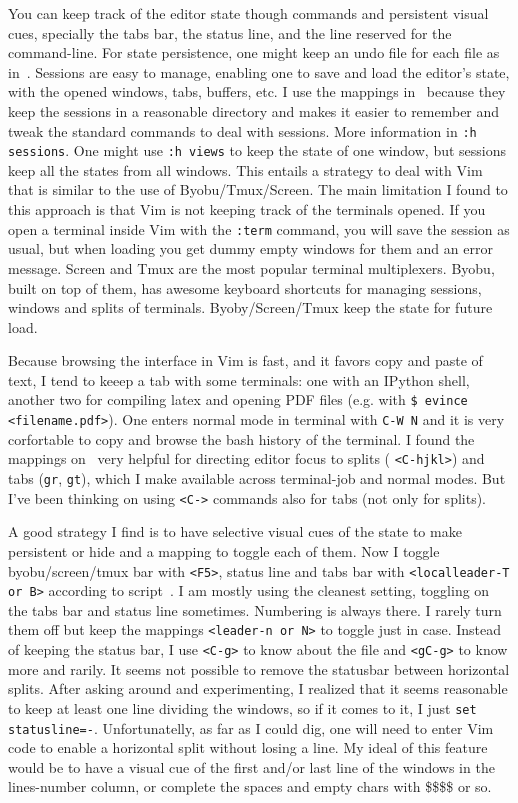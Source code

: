 \documentclass{article}
\newcommand{\ttt}[1] {
	\texttt{<#1>}}
\newcommand{\tttt}[1]{\texttt{#1}}
\begin{document}
You can keep track of the editor state though commands and persistent visual
cues, specially the tabs bar, the status line, and the line
reserved for the command-line.
For state persistence, one might keep an undo file for each file as
in~\cite{vimrc}.
Sessions are easy to manage, enabling one to save and load the
editor's state, with the opened windows, tabs, buffers, etc.
I use the mappings in~\cite{vimrc} because they keep the sessions
in a reasonable directory and makes it easier to remember and tweak
the standard commands to deal with sessions.
More information in \tttt{:h sessions}.
One might use \tttt{:h views} to keep the state of one window,
but sessions keep all the states from all windows.
This entails a strategy to deal with Vim that is similar to
the use of Byobu/Tmux/Screen.
The main limitation I found to this approach is that
Vim is not keeping track of the terminals opened.
If you open a terminal inside Vim with the \tttt{:term}
command, you will save the session as usual, but when loading
you get dummy empty windows for them and an error message.
Screen and Tmux are the most popular terminal multiplexers.
Byobu, built on top of them, has awesome keyboard shortcuts
for managing sessions, windows and splits of terminals.
Byoby/Screen/Tmux keep the state for future load.

Because browsing the interface in Vim is fast,
and it favors copy and paste of text,
I tend to keeep a tab with some terminals:
one with an IPython shell, another two for compiling latex
and opening PDF files (e.g. with \tttt{\$ evince <filename.pdf>}).
One enters normal mode in terminal with \tttt{C-W N}
and it is very corfortable to copy and browse the bash history of the
terminal.
I found the mappings on~\cite{vimrc} very helpful for directing
editor focus to splits (\ttt{C-hjkl}) and tabs (\tttt{gr}, \tttt{gt}),
which I make available across terminal-job and normal modes.
But I've been thinking on using \ttt{C-} commands also
for tabs (not only for splits).

A good strategy I find is to have selective visual cues of the state to make persistent or hide
and a mapping to toggle each of them.
Now I toggle byobu/screen/tmux bar with \ttt{F5},
status line and tabs bar with \ttt{localleader-T or B} according to script~\cite{vimrc}.
I am mostly using the cleanest setting, toggling on the tabs bar and status line sometimes. Numbering is always there. I rarely turn them off but keep the mappings \ttt{leader-n or N} to toggle just in case.
Instead of keeping the status bar, I use \ttt{C-g} to know about the
file and \ttt{gC-g} to know more and rarily.
It seems not possible to remove the statusbar between horizontal splits.
After asking around and experimenting, I realized that it seems
reasonable to keep at least one line dividing the windows, so
if it comes to it, I just \tttt{set statusline=-}.
Unfortunatelly, as far as I could dig, one will need to enter
Vim code to enable a horizontal split without losing a line.
My ideal of this feature would be to have a visual cue of the
first and/or last line of the windows in the lines-number
column, or complete the spaces and empty chars with \$\$\$\$ or so.
\end{document}
